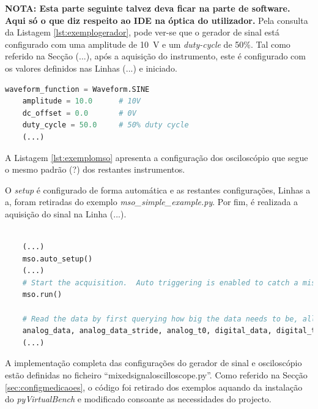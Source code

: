 \textbf{NOTA: Esta parte seguinte talvez deva ficar na parte de software. Aqui só o que diz respeito ao IDE na óptica do utilizador.}
Pela consulta da Listagem \ref{lst:exemplogerador}, pode ver-se que o gerador de sinal está configurado com uma amplitude de \SI{10}{\volt} e um \textit{duty-cycle} de 50\%. Tal como referido na Secção (...), após a aquisição do instrumento, este é configurado com os valores definidos nas Linhas (...) e iniciado.

\begin{minipage}{0.9\linewidth}
	\begin{lstlisting}[language=Python,escapechar=|, caption=Exemplo configuração do gerador de sinal - \textit{mixed\textunderscore signal\textunderscore oscilloscope.py}, label=lst:exemplogerador]
	waveform_function = Waveform.SINE
	amplitude = 10.0      # 10V
	dc_offset = 0.0       # 0V
	duty_cycle = 50.0     # 50% duty cycle
	(...)
	\end{lstlisting}
\end{minipage}

A Listagem \ref{lst:exemplomso} apresenta a configuração dos osciloscópio que segue o mesmo padrão (?) dos restantes instrumentos. 

O \textit{setup} é configurado de forma automática e as restantes configurações, Linhas a a, foram retiradas do exemplo \textit{mso\_simple\_example.py}. Por fim, é realizada a aquisição do sinal na Linha (...).

\begin{minipage}{0.9\linewidth}
	\begin{lstlisting}[language=Python,escapechar=|, caption=Exemplo configuração do oscilscópio - \textit{mixed\textunderscore signal\textunderscore oscilloscope.py}, label=lst:exemplomso]
	
	(...)
	mso.auto_setup()
	(...)
	# Start the acquisition.  Auto triggering is enabled to catch a misconfigured trigger condition.
	mso.run()
	
	# Read the data by first querying how big the data needs to be, allocating the memory, and finally performing the read.
    analog_data, analog_data_stride, analog_t0, digital_data, digital_timestamps, digital_t0, trigger_timestamp, trigger_reason = mso.read_analog_digital_u64()
	(...)
	\end{lstlisting}
\end{minipage}

A implementação completa das configurações do gerador de sinal e osciloscópio estão definidas no ficheiro ``mixed\textunderscore signal\textunderscore oscilloscope.py''. Como referido na Secção \ref{sec:configmedicaoes}, o código foi retirado dos exemplos aquando da instalação do \textit{pyVirtualBench} e modificado consoante as necessidades do projecto.